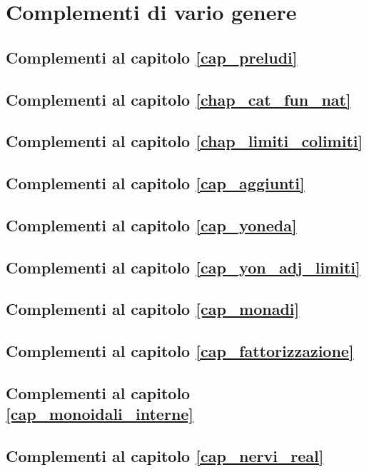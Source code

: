 \chapter{Complementi di vario genere}
\section{Complementi al capitolo \ref{cap_preludi}}
\section{Complementi al capitolo \ref{chap_cat_fun_nat}}
\section{Complementi al capitolo \ref{chap_limiti_colimiti}}
\section{Complementi al capitolo \ref{cap_aggiunti}}
\section{Complementi al capitolo \ref{cap_yoneda}}
\section{Complementi al capitolo \ref{cap_yon_adj_limiti}}
\section{Complementi al capitolo \ref{cap_monadi}}
\section{Complementi al capitolo \ref{cap_fattorizzazione}}
\section{Complementi al capitolo \ref{cap_monoidali_interne}}
\section{Complementi al capitolo \ref{cap_nervi_real}}


